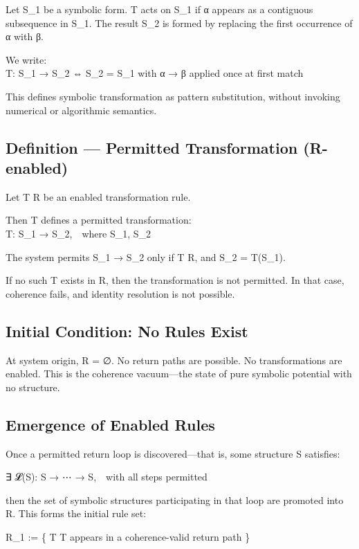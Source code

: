 Let S_1 \in \Sigma* be a symbolic form. T acts on S_1 if α appears as a
contiguous subsequence in S_1. The result S_2 is formed by replacing the
first occurrence of α with β.

We write:\\
T: S_1 → S_2 ⇔ S_2 = S_1 with α → β applied once at first match

This defines symbolic transformation as pattern substitution, without
invoking numerical or algorithmic semantics.

\subsection{Definition --- Permitted Transformation
(R-enabled)}\label{definition-permitted-transformation-r-enabled}

Let T \in R be an enabled transformation rule.

Then T defines a permitted transformation:\\
T: S_1 → S_2, where S_1, S_2 \in \Sigma*

The system permits S_1 → S_2 only if T \in R, and S_2 = T(S_1).

If no such T exists in R, then the transformation is not permitted. In
that case, coherence fails, and identity resolution is not possible.

\subsection{Initial Condition: No Rules
Exist}\label{initial-condition-no-rules-exist}

At system origin, R = ∅. No return paths are possible. No
transformations are enabled. This is the coherence vacuum---the state of
pure symbolic potential with no structure.

\subsection{Emergence of Enabled
Rules}\label{emergence-of-enabled-rules}

Once a permitted return loop is discovered---that is, some structure S \in
\Sigma* satisfies:

∃ 𝓛(S): S → ⋯ → S, with all steps permitted

then the set of symbolic structures participating in that loop are
promoted into R. This forms the initial rule set:

R_1 := \{ T \in \Sigma* \textbar{} T appears in a coherence-valid return path \}

